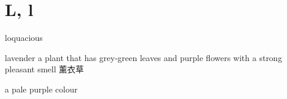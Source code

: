 \section{L, l}

\begin{DefWord}{loquacious}
\end{DefWord}

\begin{DefWord}{lavender}
    a plant that has grey-green leaves and purple flowers with a strong pleasant smell 薰衣草

    a pale purple colour
\end{DefWord}